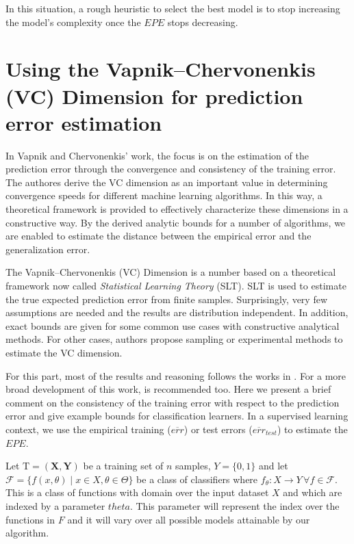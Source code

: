 In this situation, a rough heuristic to select the best model is to stop increasing the model's complexity once the $EPE$ stops decreasing.

\section{ Using the Vapnik--Chervonenkis (VC) Dimension for prediction error estimation} \label{section-VcDimension}


In Vapnik and Chervonenkis' work, the focus is on the estimation of the prediction error through the convergence and consistency of the training error. The authores derive the VC dimension as an important value in determining convergence speeds for different machine learning algorithms. In this way, a theoretical framework is provided to effectively characterize these dimensions in a constructive way. By the derived analytic bounds for a number of algorithms, we are enabled to estimate the distance between the empirical error and the generalization error.

The Vapnik--Chervonenkis (VC) Dimension is a number based on a theoretical framework now called \textit{Statistical Learning Theory} (SLT). SLT is used to estimate the true expected prediction error from finite samples. Surprisingly, very few assumptions are needed and the results are distribution independent. In addition, exact bounds are given for some common use cases with constructive analytical methods. For other cases, authors propose sampling or experimental methods to estimate the VC dimension. 

For this part, most of the results and reasoning follows the works in \textcite{cherkassky-learning2007}. For a more broad development of this work, \textcite{vapnik-nature2013} is recommended too. Here we present a brief comment on the consistency of the training error with respect to the prediction error and give example bounds for classification learners. In a supervised learning context, we use the empirical training ($\overline{err}$) or test errors ($\overline{err}_{test}$) to estimate the $EPE$.

Let $\mathrm{T} = (\textbf{X},\textbf{Y})$ be a training set of $n$ samples, $Y = \{0,1 \}$ and let $\mathcal {F} = \{f(x,\theta) \mid x \in X, \theta \in \Theta\}$ be a class of classifiers where $f_\theta: X \rightarrow Y \, \forall f \in \mathcal {F}$. This is a class of functions with domain over the input dataset $X$ and which are indexed by a parameter $theta$. This parameter will represent the index over the functions in $F$ and it will vary over all possible models attainable by our algorithm.

